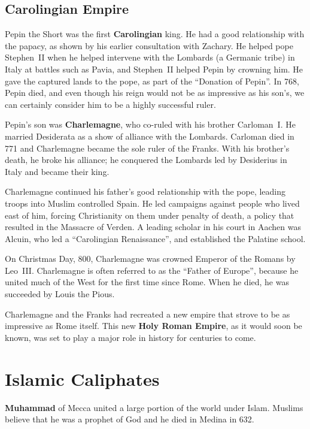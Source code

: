 \subsection*{Carolingian Empire}

Pepin the Short was the first \textbf{Carolingian} king.
He had a good relationship with the papacy, as shown by his earlier consultation with Zachary.
He helped pope Stephen~II when he helped intervene with the Lombards (a Germanic tribe)
in Italy at battles such as Pavia, and Stephen~II helped Pepin by crowning him.
He gave the captured lands to the pope, as part of the ``Donation of Pepin''.
In 768, Pepin died, and even though his reign would not be as impressive as his son's,
we can certainly consider him to be a highly successful ruler.

Pepin's son was \textbf{Charlemagne}, who co-ruled with his brother Carloman~I.
He married Desiderata as a show of alliance with the Lombards.
Carloman died in 771 and Charlemagne became the sole ruler of the Franks.
With his brother's death, he broke his alliance;
he conquered the Lombards led by Desiderius in Italy and became their king.

Charlemagne continued his father's good relationship with the pope, leading troops into Muslim controlled Spain.
He led campaigns against people who lived east of him, forcing Christianity on them under penalty of death,
a policy that resulted in the Massacre of Verden.
A leading scholar in his court in Aachen was Alcuin,
who led a ``Carolingian Renaissance'', and established the Palatine school.

On Christmas Day, 800, Charlemagne was crowned Emperor of the Romans by Leo~III\@.
Charlemagne is often referred to as the ``Father of Europe'',
because he united much of the West for the first time since Rome.
When he died, he was succeeded by Louis the Pious.

Charlemagne and the Franks had recreated a new empire that strove to be as impressive as Rome itself.
This new \textbf{Holy Roman Empire}, as it would soon be known,
was set to play a major role in history for centuries to come.

\section{Islamic Caliphates}

\textbf{Muhammad} of Mecca united a large portion of the world under Islam.
Muslims believe that he was a prophet of God and he died in Medina in 632.

